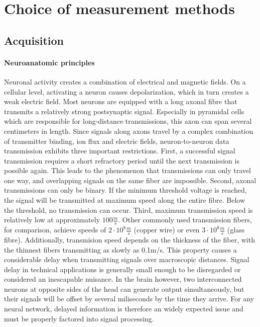 \section{Choice of measurement methods}

\subsection{Acquisition}

\paragraph{Neuroanatomic principles}
Neuronal activity creates a combination of electrical and magnetic fields.
On a cellular level, activating a neuron causes depolarization, which in turn creates a weak electric field.
Most neurons are equipped with a long axonal fibre that transmits a relatively strong postsynaptic signal.
Especially in pyramidal cells which are responsible for long-distance transmissions, this axon can span several centimeters in length.
Since signals along axons travel by a complex combination of transmitter binding, ion flux and electric fields, neuron-to-neuron data transmission exhibits three important restrictions.
First, a successful signal transmission requires a short refractory period until the next transmission is possible again.
This leads to the phenomenon that transmissions can only travel one way, and overlapping signals on the same fiber are impossible.
Second, axonal transmissions can only be binary.
If the minimum threshold voltage is reached, the signal will be transmitted at maximum speed along the entire fibre.
Below the threshold, no transmission can occur.
Third, maximum transmission speed is relatively low at approximately $100\frac{m}{s}$.
Other commonly used transmission fibers, for comparison, achieve speeds of $2\cdot10^8\frac{m}{s}$ (copper wire) or even $3\cdot10^8\frac{m}{s}$ (glass fibre).
Additionally, transmision speed depends on the thickness of the fiber, with the thinnest fibers transmitting as slowly as 0.1m/s.
This property causes a considerable delay when transmitting signals over macroscopic distances.
Signal delay in technical applications is generally small enough to be disregarded or considered an inescapable nuisance.
In the brain however, two interconnected neurons at opposite sides of the head can generate output simultaneously, but their signals will be offset by several miliseconds by the time they arrive.
For any neural network, delayed information is therefore an widely expected issue and must be properly factored into signal processing.

